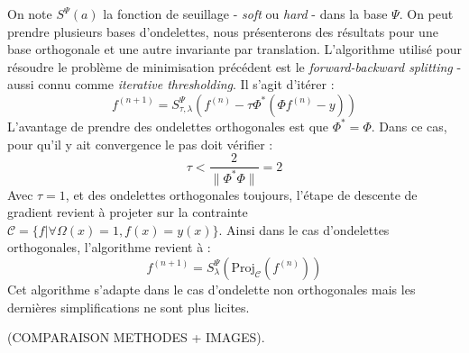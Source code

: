 On note $S^{\Psi}(a)$ la fonction de seuillage - \emph{soft} ou \emph{hard} - dans la base $\Psi$. On peut prendre plusieurs bases d'ondelettes, nous présenterons des résultats pour une base orthogonale et une autre invariante par translation. L'algorithme utilisé pour résoudre le problème de minimisation précédent est le \emph{forward-backward splitting} - aussi connu comme \emph{iterative thresholding}. Il s'agit d'itérer : 
\begin{equation}
f^{(n+1)} = S^{\Psi}_{\tau,\lambda}(f^{(n)} - \tau \Phi^*(\Phi f^{(n)} - y) )
\end{equation}
L'avantage de prendre des ondelettes orthogonales est que $\Phi^* = \Phi$. Dans ce cas, pour qu'il y ait convergence le pas doit vérifier :
\begin{equation}
\tau < \frac{2}{\| \Phi^* \Phi \|} = 2
\end{equation}
Avec $\tau = 1$, et des ondelettes orthogonales toujours, l'étape de descente de gradient revient à projeter sur la contrainte $\mathcal{C} = \{f | \forall \Omega(x) = 1, f(x) = y(x) \}$. Ainsi dans le cas d'ondelettes orthogonales, l'algorithme revient à :
\begin{equation}
f^{(n+1)} = S_{\lambda}^{\Psi} (\text{Proj}_{\mathcal{C}} (f^{(n)}))
\end{equation}
Cet algorithme s'adapte dans le cas d'ondelette non orthogonales mais les dernières simplifications ne sont plus licites. 

(COMPARAISON METHODES + IMAGES).






